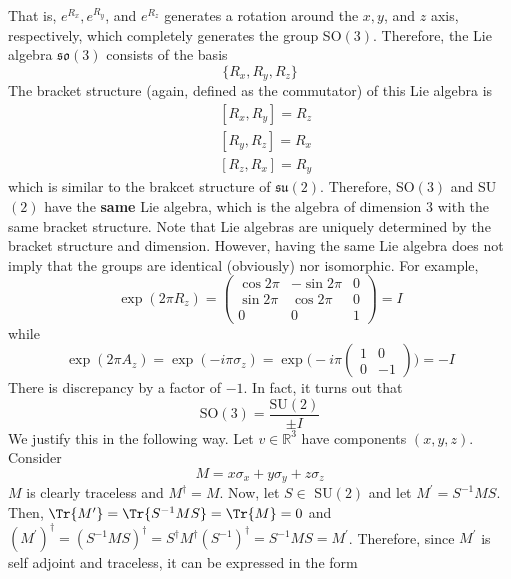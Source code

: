   That is, $e^{R_x}, e^{R_y}$, and $e^{R_z}$ generates a rotation around the $x, y$, and $z$ axis, respectively, which completely generates the group SO$(3)$. Therefore, the Lie algebra $\mathfrak{so}(3)$ consists of the basis 
  \begin{equation}
    \{R_x, R_y, R_z\}
  \end{equation}
  The bracket structure (again, defined as the commutator) of this Lie algebra is 
  \begin{align*}
    & [R_x, R_y] = R_z \\
    & [R_y, R_z] = R_x \\
    & [R_z, R_x] = R_y
  \end{align*}
  which is similar to the brakcet structure of $\mathfrak{su}(2)$. Therefore, SO$(3)$ and SU$(2)$ have the \textbf{same} Lie algebra, which is the algebra of dimension 3 with the same bracket structure. Note that Lie algebras are uniquely determined by the bracket structure and dimension. However, having the same Lie algebra does not imply that the groups are identical (obviously) nor isomorphic. For example, 
  \begin{equation}
    \exp(2\pi R_z) = \begin{pmatrix}
    \cos{2\pi} & -\sin{2\pi} & 0 \\
    \sin{2\pi} & \cos{2\pi} & 0 \\
    0 & 0 & 1
    \end{pmatrix} = I
  \end{equation}
  while 
  \begin{equation}
    \exp(2\pi A_z) = 
    \exp(-i \pi \sigma_z) = \exp \bigg(-i \pi \begin{pmatrix}
    1&0\\0&-1
    \end{pmatrix} \bigg) = -I
  \end{equation}
  There is discrepancy by a factor of $-1$. In fact, it turns out that
  \begin{equation}
    \text{SO}(3) = \frac{\text{SU}(2)}{\pm I}
  \end{equation}
  We justify this in the following way. Let $v \in \mathbb{R}^3$ have components $(x, y, z)$. Consider
  \begin{equation}
    M = x \sigma_x + y \sigma_y + z \sigma_z
  \end{equation}
  $M$ is clearly traceless and $M^\dagger = M$. Now, let $S \in$ SU$(2)$ and let $M^\prime = S^{-1} M S$. Then, $\Tr{M^\prime} = \Tr{S^{-1} M S} = \Tr{M} = 0$ and $(M^\prime)^\dagger = (S^{-1} M S)^\dagger = S^\dagger M^\dagger (S^{-1})^\dagger = S^{-1} M S = M^\prime$. Therefore, since $M^\prime$ is self adjoint and traceless, it can be expressed in the form

